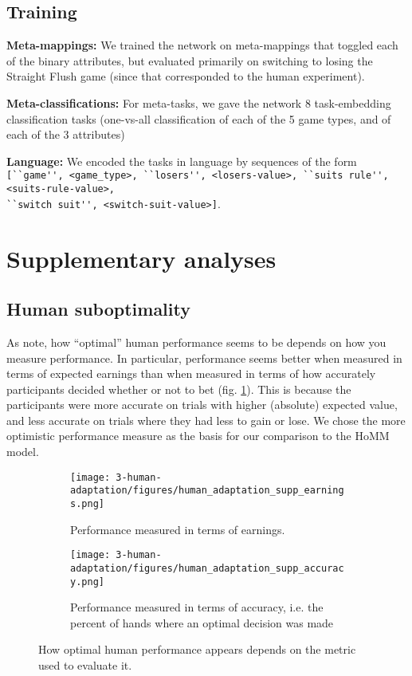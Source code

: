 \subsection{Training}
\textbf{Meta-mappings:} We trained the network on meta-mappings that toggled each of the binary attributes, but evaluated primarily on switching to losing the Straight Flush game (since that corresponded to the human experiment).\par
\textbf{Meta-classifications:} For meta-tasks, we gave the network 8 task-embedding classification tasks (one-vs-all classification of each of the 5 game types, and of each of the 3 attributes) \par
\textbf{Language:} We encoded the tasks in language by sequences of the form\\
\verb|[``game'', <game_type>, ``losers'', <losers-value>, ``suits rule'', <suits-rule-value>,|\\
\verb|``switch suit'', <switch-suit-value>]|.



\section{Supplementary analyses}
\subsection{Human suboptimality}\label{appendix:human:suboptimality}
As \citet{Jarvstad2013} note, how ``optimal'' human performance seems to be depends on how you measure performance. In particular, performance seems better when measured in terms of expected earnings than when measured in terms of how accurately participants decided whether or not to bet (fig. \ref{fig:appx_human_calibration}). This is because the participants were more accurate on trials with higher (absolute) expected value, and less accurate on trials where they had less to gain or lose. We chose the more optimistic performance measure as the basis for our comparison to the HoMM model.
\begin{figure}[H]
\centering
\begin{subfigure}[t]{0.5\textwidth}
\texttt{[image: 3-human-adaptation/figures/human\_adaptation\_supp\_earnings.png]}
\caption{Performance measured in terms of earnings.}
\end{subfigure}%
\begin{subfigure}[t]{0.5\textwidth}
\texttt{[image: 3-human-adaptation/figures/human\_adaptation\_supp\_accuracy.png]}
\caption{Performance measured in terms of accuracy, i.e. the percent of hands where an optimal decision was made}
\end{subfigure}%
\caption{How optimal human performance appears depends on the metric used to evaluate it.} \label{fig:appx_human_calibration}
\end{figure}


